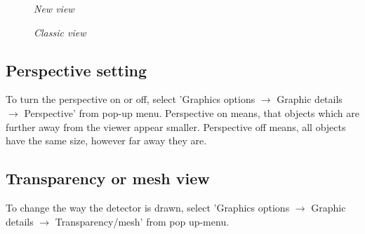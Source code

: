 \documentclass[a4paper,10pt]{article}
\begin{document}
\begin{figure}[h]
\begin{minipage}[t]{6cm}
\setlength{\fboxsep}{0mm}
\centerline{}
\caption{\label{CEDViewer} \textsl{New view}}
\end{minipage}
\hfill
\begin{minipage}[t]{6cm}
\setlength{\fboxsep}{0mm}
\centerline{}
\caption{\label{DSTViewer}\textsl{Classic view}}
\end{minipage}
\end{figure}


\subsection{Perspective setting}
To turn the perspective on or off, select 'Graphics options $\rightarrow$ Graphic details $\rightarrow$ Perspective' from pop-up menu. Perspective on means, that objects which are further away from the viewer appear smaller. Perspective off means, all objects have the same size, however far away they are. 

\subsection{Transparency or mesh view}
To change the way the detector is drawn, select 'Graphics options $\rightarrow$ Graphic details $\rightarrow$ Transparency/mesh' from pop up-menu.
\end{document}
